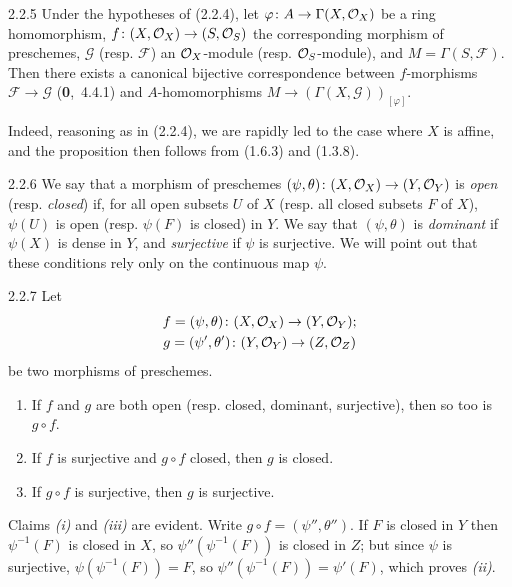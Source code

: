 \documentclass[../main.tex]{subfiles}
\begin{document}
\begin{cx}[Proposition]{2.2.5}
    Under the hypotheses of (2.2.4), let $\varphi\colon A\to\Gamma(X,\mathcal{O}_X)$ be a ring homomorphism, $f\colon(X,\mathcal{O}_X)\to(S,\mathcal{O}_S)$ the corresponding morphism of preschemes, $\mathscr{G}$ (resp. $\mathscr{F}$) an $\mathcal{O}_X$-module (resp. $\mathcal{O}_S$-module), and $M=\Gamma(S,\mathscr{F})$.
    Then there exists a canonical bijective correspondence between $f$-morphisms $\mathscr{F}\to\mathscr{G}$ (\textbf{0},~4.4.1) and $A$-homomorphisms $M\to(\Gamma(X,\mathscr{G}))_{[\varphi]}$.
\end{cx}
Indeed, reasoning as in (2.2.4), we are rapidly led to the case where $X$ is affine, and the proposition then follows from (1.6.3) and (1.3.8).

\begin{cx}{2.2.6}
    We say that a morphism of preschemes $(\psi,\theta)\colon(X,\mathcal{O}_X)\to(Y,\mathcal{O}_Y)$ is \textit{open} (resp. \textit{closed}) if, for all open subsets $U$ of $X$ (resp. all closed subsets $F$ of $X$), $\psi(U)$ is open (resp. $\psi(F)$ is closed) in $Y$.
    We say that $(\psi,\theta)$ is \textit{dominant} if $\psi(X)$ is dense in $Y$, and \textit{surjective} if $\psi$ is surjective.
    We will point out that these conditions rely only on the continuous map $\psi$.
\end{cx}

\begin{cx}[Proposition]{2.2.7}
    Let
    \begin{gather*}
        f=(\psi,\theta)\colon(X,\mathcal{O}_X)\to(Y,\mathcal{O}_Y);\\
        g=(\psi',\theta')\colon(Y,\mathcal{O}_Y)\to(Z,\mathcal{O}_Z)
    \end{gather*}
    be two morphisms of preschemes.
    \begin{enumerate}[label=(\roman*)]
        \item If $f$ and $g$ are both open (resp. closed, dominant, surjective), then so too is $g\circ f$.
        \item If $f$ is surjective and $g\circ f$ closed, then $g$ is closed.
        \item If $g\circ f$ is surjective, then $g$ is surjective.
    \end{enumerate}
\end{cx}
Claims \textit{(i)} and \textit{(iii)} are evident.
Write $g\circ f=(\psi'',\theta'')$.
If $F$ is closed in $Y$ then $\psi^{-1}(F)$ is closed in $X$, so $\psi''(\psi^{-1}(F))$ is closed in $Z$; but since $\psi$ is surjective, $\psi(\psi^{-1}(F))=F$, so $\psi''(\psi^{-1}(F))=\psi'(F)$, which proves \textit{(ii)}.
\end{document}
